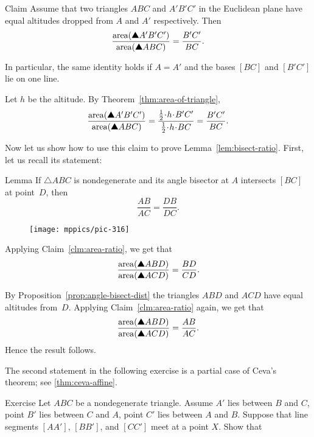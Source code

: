 {\begin{thm}{Claim}\label{clm:area-ratio}
Assume  that two triangles $ABC$ and $A'B'C'$ in the Euclidean plane 
have equal altitudes dropped from $A$ and $A'$ respectively.
Then
\[\frac{\area(\solidtriangle A'B'C')}{\area(\solidtriangle ABC)}
=
\frac{B'C'}{BC}.\]

In particular, the same identity holds if $A=A'$ and the bases $[BC]$ and $[B'C']$ lie on one line.
\end{thm}

Let $h$ be the altitude.
By Theorem~\ref{thm:area-of-triangle},
\[\frac{\area(\solidtriangle A'B'C')}{\area(\solidtriangle ABC)}
=
\frac{\frac12 \cdot h\cdot B'C'}{\frac12 \cdot h\cdot BC}
=
\frac{B'C'}{BC}.\]
\qedsf

Now let us show how to use this claim to prove Lemma~\ref{lem:bisect-ratio}.
First, let us recall its statement:

\begin{thm*}{Lemma}
If $\triangle A B C$ is nondegenerate and its angle bisector at $A$ intersects $[BC]$ at point~$D$, then 
$$\frac{AB}{AC}=\frac{DB}{DC}.$$
\end{thm*}

\begin{wrapfigure}{r}{30 mm}
\vskip-0mm
\centering
\texttt{[image: mppics/pic-316]}
\end{wrapfigure}

Applying  Claim~\ref{clm:area-ratio}, we get that
\[\frac{\area(\solidtriangle ABD)}{\area(\solidtriangle ACD)}
=\frac{BD}{CD}.\]

By Proposition~\ref{prop:angle-bisect-dist} the triangles $ABD$ and $ACD$ have equal altitudes from~$D$.
Applying  Claim~\ref{clm:area-ratio} again, we get that
\[\frac{\area(\solidtriangle ABD)}{\area(\solidtriangle ACD)}=\frac{AB}{AC}.\]
Hence the result follows.
\qeds

The second statement in the following exercise is a partial case of Ceva's theorem; see \ref{thm:ceva-affine}.



\begin{thm}{Exercise}\label{ex:ceva}
Let $ABC$ be a nondegenerate triangle.
Assume $A'$ lies between $B$ and $C$,
point $B'$ lies between $C$ and $A$,
point $C'$ lies between $A$ and $B$.
Suppose that line segments $[AA']$, $[BB']$, and $[CC']$ meet at a point $X$.
Show that 

\vskip-3mm


\end{thm}}
